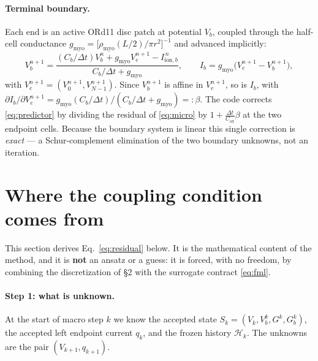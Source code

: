 \documentclass[11pt]{article}
\newcommand{\Ib}{I_{b}}
\newcommand{\Cax}{C_{\mathrm{ax}}}
\newcommand{\Cb}{C_{b}}
\newcommand{\gmyo}{g_{\mathrm{myo}}}
\begin{document}
\paragraph{Terminal boundary.}
Each end is an active ORd11 disc patch at potential $V_b$, coupled through the
half-cell conductance $\gmyo=\bigl[\rho_{\mathrm{myo}}(L/2)/\pi r^2\bigr]^{-1}$
and advanced implicitly:
\begin{equation}
V_b^{n+1}=
\frac{(\Cb/\Delta t)V_b^{n}+\gmyo V_e^{n+1}-I_{\mathrm{ion},b}^{\,n}}
 {\Cb/\Delta t+\gmyo},
\qquad
\Ib=\gmyo\bigl(V_e^{n+1}-V_b^{n+1}\bigr),
\label{eq:vb}
\end{equation}
with $V_e^{n+1}=(V^{n+1}_0,V^{n+1}_{N-1})$. Since $V_b^{n+1}$ is affine in
$V_e^{n+1}$, so is $\Ib$, with
$\partial\Ib/\partial V_e^{n+1}=\gmyo(\Cb/\Delta t)/(\Cb/\Delta t+\gmyo)=:\beta$.
The code corrects \eqref{eq:predictor} by dividing the residual of
\eqref{eq:micro} by $1+\tfrac{\Delta t}{\Cax}\beta$ at the two endpoint cells.
Because the boundary system is linear this single correction is \emph{exact} ---
a Schur-complement elimination of the two boundary unknowns, not an iteration.

\section{Where the coupling condition comes from}
\label{sec:residual}

This section derives Eq.~\eqref{eq:residual} below. It is the mathematical
content of the method, and it is \textbf{not} an ansatz or a guess: it is forced,
with no freedom, by combining the discretization of \S2 with the surrogate
contract \eqref{eq:fml}.

\paragraph{Step 1: what is unknown.}
At the start of macro step $k$ we know the accepted state
$S_k=(V_k,V_b^k,G^k,G_b^k)$, the accepted left endpoint current $q_k$, and the
frozen history $\mathcal H_k$. The unknowns are the pair $(V_{k+1},q_{k+1})$.
\end{document}
